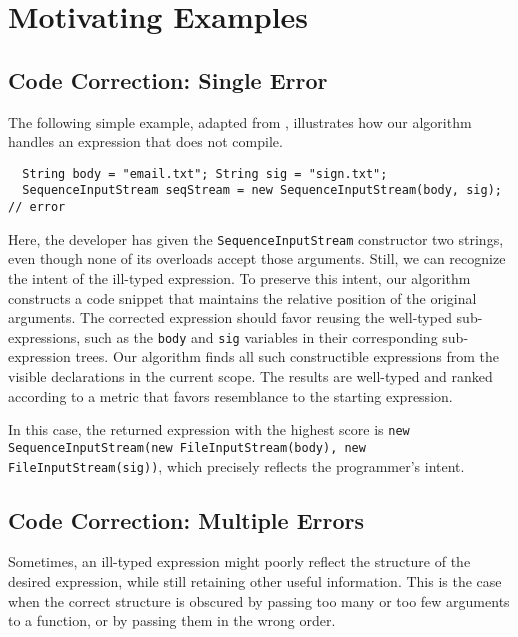 \section{Motivating Examples}
\label{sec:examples}

\subsection{Code Correction: Single Error}
\label{sec:examples:single}
The following simple example, adapted from \cite{GveroETAL13CompleteCompletionTypesWeights}, illustrates how our algorithm handles an expression that does not compile.
\begin{lstlisting}
  String body = "email.txt"; String sig = "sign.txt";
  SequenceInputStream seqStream = new SequenceInputStream(body, sig); // error
\end{lstlisting}
Here, the developer has given the \lstinline{SequenceInputStream} constructor two strings, even though none of its overloads accept those arguments. Still, we can recognize the intent of the ill-typed expression. To preserve this intent, our algorithm constructs a code snippet that maintains the relative position of the original arguments. The corrected expression should favor reusing the well-typed sub-expressions, such as the \lstinline{body} and \lstinline{sig} variables in their corresponding sub-expression trees. Our algorithm finds all such constructible expressions from the visible declarations in the current scope. The results are well-typed and ranked according to a metric that favors resemblance to the starting expression.

In this case, the returned expression with the highest score is \lstinline{new SequenceInputStream(new FileInputStream(body), new FileInputStream(sig))}, which precisely reflects the programmer's intent.

\subsection{Code Correction: Multiple Errors}
\label{sec:examples:multiple}
Sometimes, an ill-typed expression might poorly reflect the structure of the desired expression, while still retaining other useful information. This is the case when the correct structure is obscured by passing too many or too few arguments to a function, or by passing them in the wrong order.


